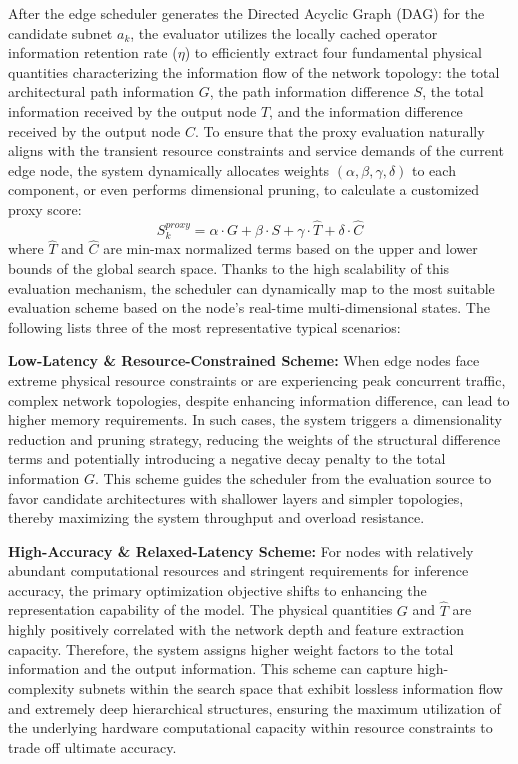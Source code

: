\documentclass[conference]{IEEEtran}
\begin{document}
After the edge scheduler generates the Directed Acyclic Graph (DAG) for the candidate subnet $a_k$, the evaluator utilizes the locally cached operator information retention rate ($\eta$) to efficiently extract four fundamental physical quantities characterizing the information flow of the network topology: the total architectural path information $G$, the path information difference $S$, the total information received by the output node $T$, and the information difference received by the output node $C$. To ensure that the proxy evaluation naturally aligns with the transient resource constraints and service demands of the current edge node, the system dynamically allocates weights $(\alpha, \beta, \gamma, \delta)$ to each component, or even performs dimensional pruning, to calculate a customized proxy score:
\begin{equation}
S_k^{proxy} = \alpha \cdot G + \beta \cdot S + \gamma \cdot \widehat{T} + \delta \cdot \widehat{C}
\label{eq:adaptive_gstc}
\end{equation}
where $\widehat{T}$ and $\widehat{C}$ are min-max normalized terms based on the upper and lower bounds of the global search space. Thanks to the high scalability of this evaluation mechanism, the scheduler can dynamically map to the most suitable evaluation scheme based on the node's real-time multi-dimensional states. The following lists three of the most representative typical scenarios:

\textbf{Low-Latency \& Resource-Constrained Scheme:} 
When edge nodes face extreme physical resource constraints or are experiencing peak concurrent traffic, complex network topologies, despite enhancing information difference, can lead to higher memory requirements. In such cases, the system triggers a dimensionality reduction and pruning strategy, reducing the weights of the structural difference terms and potentially introducing a negative decay penalty to the total information $G$. This scheme guides the scheduler from the evaluation source to favor candidate architectures with shallower layers and simpler topologies, thereby maximizing the system throughput and overload resistance.

\textbf{High-Accuracy \& Relaxed-Latency Scheme:} 
For nodes with relatively abundant computational resources and stringent requirements for inference accuracy, the primary optimization objective shifts to enhancing the representation capability of the model. The physical quantities $G$ and $\widehat{T}$ are highly positively correlated with the network depth and feature extraction capacity. Therefore, the system assigns higher weight factors to the total information and the output information. This scheme can capture high-complexity subnets within the search space that exhibit lossless information flow and extremely deep hierarchical structures, ensuring the maximum utilization of the underlying hardware computational capacity within resource constraints to trade off ultimate accuracy.
\end{document}
